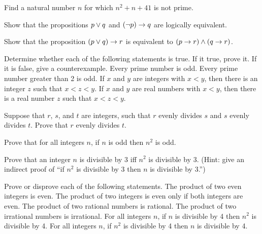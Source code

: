 \begin{exercises}

\problem Find a natural number $n$ for which $n^2+n+41$ is not prime.

\problem Show that the propositions $p\vee q$ and $(\lnot p)\rightarrow q$
are logically equivalent.

\problem Show that the proposition $(p\vee q)\rightarrow r$ is equivalent
to $(p\rightarrow r)\wedge(q\rightarrow r)$.

\problem Determine whether each of the following statements is
true.  If it true, prove it.  If it is false, give a counterexample.
\ppart Every prime number is odd.
\ppart Every prime number greater than 2 is odd.
\ppart If $x$ and $y$ are integers with $x<y$, then there is an integer
$z$ such that $x<z<y$.
\ppart If $x$ and $y$ are real numbers with $x<y$, then there is a real number
$z$ such that $x<z<y$.

\problem Suppose that $r$, $s$, and $t$ are integers, such that $r$ evenly divides $s$ and
$s$ evenly divides $t$.  Prove that $r$ evenly divides $t$.

\problem Prove that for all integers $n$, if $n$ is odd then $n^2$ is odd.

\problem\label{divby3}Prove that an integer $n$ is divisible by 3 iff $n^2$ is divisible
by 3.  (Hint: give an indirect proof of ``if $n^2$ is divisible by 3 then
$n$ is divisible by 3.'')

\problem Prove or disprove each of the following statements.
\ppart The product of two even integers is even.
\ppart The product of two integers is even only if both integers are even.
\ppart The product of two rational numbers is rational.
\ppart The product of two irrational numbers is irrational.
\ppart For all integers $n$, if $n$ is divisible by 4 then $n^2$ is
divisible by 4.
\ppart For all integers $n$, if $n^2$ is divisible by 4 then $n$ is
divisible by 4.

\end{exercises}



